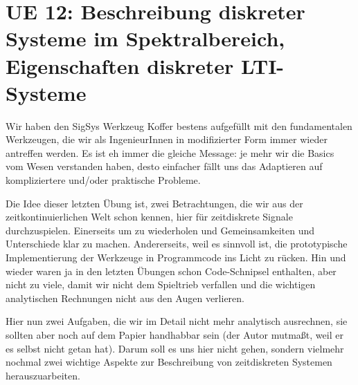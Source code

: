 \newpage
\section{UE 12: Beschreibung diskreter Systeme im Spektralbereich, Eigenschaften diskreter LTI-Systeme}

Wir haben den SigSys Werkzeug Koffer bestens aufgefüllt mit den fundamentalen
Werkzeugen, die wir als IngenieurInnen in modifizierter Form
immer wieder antreffen werden. Es ist eh immer die gleiche Message: je mehr wir
die Basics vom Wesen verstanden haben, desto einfacher fällt uns das Adaptieren auf
kompliziertere und/oder praktische Probleme.

Die Idee dieser letzten Übung ist, zwei Betrachtungen, die wir aus der
zeitkontinuierlichen Welt schon kennen, hier für zeitdiskrete Signale
durchzuspielen. Einerseits um zu wiederholen und Gemeinsamkeiten und Unterschiede
klar zu machen. Andererseits, weil es sinnvoll ist,
die prototypische Implementierung der Werkzeuge in Programmcode
ins Licht zu rücken.
Hin und wieder waren ja in den letzten Übungen schon Code-Schnipsel
enthalten, aber nicht zu viele, damit wir nicht dem Spieltrieb verfallen und
die wichtigen analytischen Rechnungen nicht aus den Augen verlieren.

Hier nun zwei Aufgaben, die wir im Detail nicht mehr analytisch ausrechnen,
sie sollten aber noch auf dem Papier
handhabbar sein (der Autor mutmaßt, weil er es selbst nicht getan hat). Darum
soll es uns hier nicht gehen, sondern vielmehr nochmal zwei wichtige
Aspekte zur Beschreibung von zeitdiskreten Systemen herauszuarbeiten.





\clearpage
